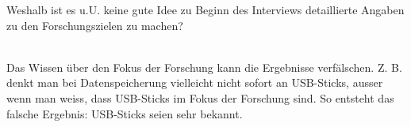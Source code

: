 \begin{exercise}
  Weshalb ist es u.U. keine gute Idee zu Beginn des Interviews detaillierte Angaben zu den Forschungszielen zu machen?
  \\\\
\end{exercise}
Das Wissen über den Fokus der Forschung kann die Ergebnisse verfälschen.
Z. B. denkt man bei Datenspeicherung vielleicht nicht sofort an USB-Sticks,
ausser wenn man weiss, dass USB-Sticks im Fokus der Forschung sind.
So entsteht das falsche Ergebnis: USB-Sticks seien sehr bekannt.